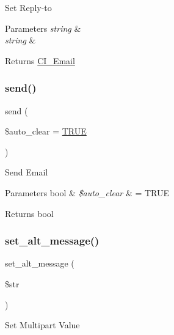 Set Reply-\/to


\begin{DoxyParams}{Parameters}
{\em string} & \\
\hline
{\em string} & \\
\hline
\end{DoxyParams}
\begin{DoxyReturn}{Returns}
\mbox{\hyperlink{class_c_i___email}{C\+I\+\_\+\+Email}} 
\end{DoxyReturn}
\mbox{\label{class_c_i___email_a547a65a81ba2d1f98cc15121a45dab11}} 
\subsubsection{\texorpdfstring{send()}{send()}}
{\footnotesize\ttfamily send (\begin{DoxyParamCaption}\item[{}]{\$auto\+\_\+clear = {\ttfamily \mbox{\hyperlink{constants_8php_ae04a3efe6aa42044f803ee90c2277846}{T\+R\+UE}}} }\end{DoxyParamCaption})}

Send Email


\begin{DoxyParams}[1]{Parameters}
bool & {\em \$auto\+\_\+clear} & = T\+R\+UE \\
\hline
\end{DoxyParams}
\begin{DoxyReturn}{Returns}
bool 
\end{DoxyReturn}
\mbox{\label{class_c_i___email_a18f0b650e6e9a859e1936a41e86fb3a6}} 
\subsubsection{\texorpdfstring{set\+\_\+alt\+\_\+message()}{set\_alt\_message()}}
{\footnotesize\ttfamily set\+\_\+alt\+\_\+message (\begin{DoxyParamCaption}\item[{}]{\$str }\end{DoxyParamCaption})}

Set Multipart Value


